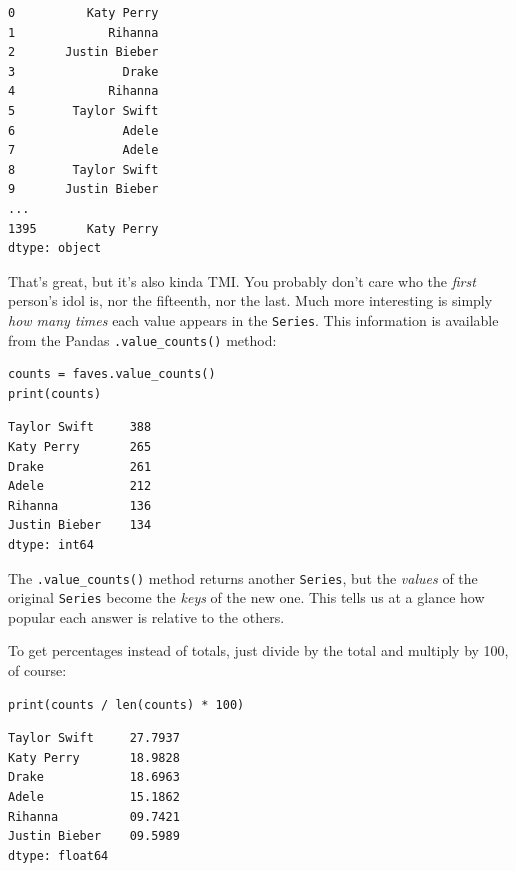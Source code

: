 \begin{Verbatim}[fontsize=\CBCodeSmall,samepage=true,frame=leftline,framesep=5mm,framerule=1mm]
0          Katy Perry
1             Rihanna
2       Justin Bieber
3               Drake
4             Rihanna
5        Taylor Swift
6               Adele
7               Adele
8        Taylor Swift
9       Justin Bieber
...
1395       Katy Perry
dtype: object
\end{Verbatim}


That's great, but it's also kinda TMI. You probably don't care who the
\textit{first} person's idol is, nor the fifteenth, nor the last. Much more
interesting is simply \textit{how many times} each value appears in the
\texttt{Series}. This information is available from the Pandas
\texttt{.value\_counts()} method:

\begin{Verbatim}[fontsize=\small,samepage=true,frame=single,framesep=3mm]
counts = faves.value_counts()
print(counts)
\end{Verbatim}

\begin{Verbatim}[fontsize=\small,samepage=true,frame=leftline,framesep=5mm,framerule=1mm]
Taylor Swift     388
Katy Perry       265
Drake            261
Adele            212
Rihanna          136
Justin Bieber    134
dtype: int64
\end{Verbatim}

The \texttt{.value\_counts()} method returns another \texttt{Series}, but the
\textit{values} of the original \texttt{Series} become the \textit{keys} of the
new one. This tells us at a glance how popular each answer is relative to the
others.

To get percentages instead of totals, just divide by the total and multiply by
100, of course:

\begin{Verbatim}[fontsize=\small,samepage=true,frame=single,framesep=3mm]
print(counts / len(counts) * 100)
\end{Verbatim}

\begin{Verbatim}[fontsize=\small,samepage=true,frame=leftline,framesep=5mm,framerule=1mm]
Taylor Swift     27.7937
Katy Perry       18.9828
Drake            18.6963
Adele            15.1862
Rihanna          09.7421
Justin Bieber    09.5989
dtype: float64
\end{Verbatim}

